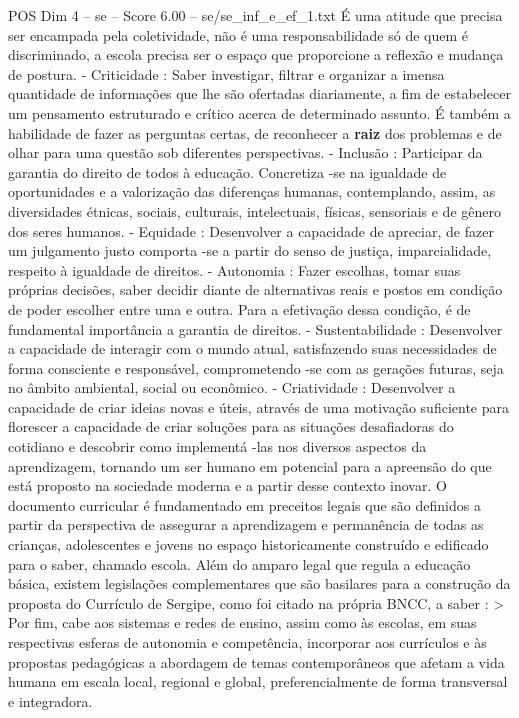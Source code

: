 \begin{textsample}{POS Dim 4 – se – Score 6.00 – se/se\_inf\_e\_ef\_1.txt}
É uma atitude que precisa ser encampada pela coletividade, não é uma responsabilidade só de quem é discriminado, a escola precisa ser o espaço que proporcione a reflexão e mudança de postura. - Criticidade : Saber investigar, filtrar e organizar a imensa quantidade de informações que lhe são ofertadas diariamente, a fim de estabelecer um pensamento estruturado e crítico acerca de determinado assunto.
É também a habilidade de fazer as perguntas certas, de reconhecer a \textbf{raiz} dos problemas e de olhar para uma questão sob diferentes perspectivas. - Inclusão : Participar da garantia do direito de todos à educação.
Concretiza -se na igualdade de oportunidades e a valorização das diferenças humanas, contemplando, assim, as diversidades étnicas, sociais, culturais, intelectuais, físicas, sensoriais e de gênero dos seres humanos. - Equidade : Desenvolver a capacidade de apreciar, de fazer um julgamento justo comporta -se a partir do senso de justiça, imparcialidade, respeito à igualdade de direitos. - Autonomia : Fazer escolhas, tomar suas próprias decisões, saber decidir diante de alternativas reais e postos em condição de poder escolher entre uma e outra.
Para a efetivação dessa condição, é de fundamental importância a garantia de direitos. - Sustentabilidade : Desenvolver a capacidade de interagir com o mundo atual, satisfazendo suas necessidades de forma consciente e responsável, comprometendo -se com as gerações futuras, seja no âmbito ambiental, social ou econômico. - Criatividade : Desenvolver a capacidade de criar ideias novas e úteis, através de uma motivação suficiente para florescer a capacidade de criar soluções para as situações desafiadoras do cotidiano e descobrir como implementá -las nos diversos aspectos da aprendizagem, tornando um ser humano em potencial para a apreensão do que está proposto na sociedade moderna e a partir desse contexto inovar.
O documento curricular é fundamentado em preceitos legais que são definidos a partir da perspectiva de assegurar a aprendizagem e permanência de todas as crianças, adolescentes e jovens no espaço historicamente construído e edificado para o saber, chamado escola.
Além do amparo legal que regula a educação básica, existem legislações complementares que são basilares para a construção da proposta do Currículo de Sergipe, como foi citado na própria BNCC, a saber : > Por fim, cabe aos sistemas e redes de ensino, assim como às escolas, em suas respectivas esferas de autonomia e competência, incorporar aos currículos e às propostas pedagógicas a abordagem de temas contemporâneos que afetam a vida humana em escala local, regional e global, preferencialmente de forma transversal e integradora.

\end{textsample}
